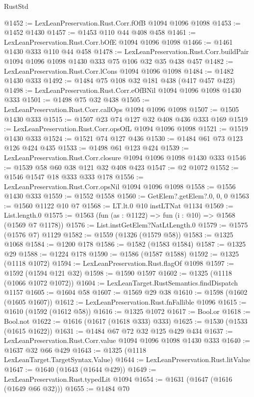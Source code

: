 \begin{lexlean}{RustStd}
\begin{coremodule}
{\begin{coremodule}
{{{{{{{{{{{@1452 := LexLeanPreservation.Rust.Corr.fOfB @1094 @1096 @1098
@1453 := @1452 @1430
@1457 := @1453 @110 @44 @408 @458
@1461 := LexLeanPreservation.Rust.Corr.bOfE @1094 @1096 @1098
@1466 := @1461 @1430 @333 @110 @44 @458
@1478 := LexLeanPreservation.Rust.Corr.buildPair
    @1094
    @1096
    @1098
    @1430
    @333
    @75
    @106
    @32
    @35
    @438
    @457
@1482 := LexLeanPreservation.Rust.Corr.lCons @1094 @1096 @1098
@1484 := @1482 @1430 @333
@1492 := @1484 @75 @108 @32 @181 @438 (@417 @457 @423)
@1498 := LexLeanPreservation.Rust.Corr.eOfBNil @1094 @1096 @1098 @1430 @333
@1501 := @1498 @75 @32 @438
@1505 := LexLeanPreservation.Rust.Corr.callOps @1094 @1096 @1098
@1507 := @1505 @1430 @333
@1515 := @1507 @23 @74 @127 @32 @408 @436 @333 @169
@1519 := LexLeanPreservation.Rust.Corr.opsOfL @1094 @1096 @1098
@1521 := @1519 @1430 @333
@1524 := @1521 @74 @127 @436
@1530 := @1484 @61 @73 @123 @126 @424 @435
@1533 := @1498 @61 @123 @424
@1539 := LexLeanPreservation.Rust.Corr.closure @1094 @1096 @1098 @1430 @333
@1546 := @1539 @58 @60 @38 @121 @32 @408 @423
@1547 := @2 @1072
@1552 := @1546 @1547 @18 @333 @333 @178
@1556 := LexLeanPreservation.Rust.Corr.opsNil @1094 @1096 @1098
@1558 := @1556 @1430 @333
@1559 := @1552 @1558
@1560 := GetElem?.getElem?.{0, 0, 0}
@1563 := @1560 @1122 @10 @7
@1568 := LT.lt.{0} @10 instLTNat @1134
@1569 := List.length.{0}
@1575 := @1563 (fun (as : @1122) => fun (i : @10) => @1568 (@1569 @7 @1178))
@1576 := List.instGetElem?NatLtLength.{0}
@1579 := @1575 (@1576 @7) @1129
@1582 := @1559 (@1326 (@1579 @58))
@1583 := @1325 @1068
@1584 := @1200 @178
@1586 := @1582 (@1583 @1584)
@1587 := @1325 @29
@1588 := @1224 @178
@1590 := @1586 (@1587 @1588)
@1592 := @1325 (@1118 @1072)
@1594 := LexLeanPreservation.Rust.flagOf @1098
@1597 := @1592 (@1594 @121 @32)
@1598 := @1590 @1597
@1602 := @1325 (@1118 (@1066 @1072 @1072))
@1604 := LexLeanTarget.RustSemantics.findDispatch @1157
@1605 := @1604 @58
@1607 := @1569 @29 @38
@1610 := @1598 (@1602 (@1605 @1607))
@1612 := LexLeanPreservation.Rust.fnFallible @1096
@1615 := @1610 (@1592 (@1612 @58))
@1616 := @1325 @1072
@1617 := Bool.or
@1618 := Bool.not
@1622 := @1616 (@1617 (@1618 @333) @333)
@1625 := @1530 (@1533 (@1615 @1622))
@1631 := @1484 @67 @72 @32 @125 @429 @434
@1637 := LexLeanPreservation.Rust.Corr.value @1094 @1096 @1098 @1430 @333
@1640 := @1637 @32 @66 @429
@1643 := @1325 (@1118 LexLeanTarget.TargetSyntax.Value)
@1644 := LexLeanPreservation.Rust.litValue
@1647 := @1640 (@1643 (@1644 @429))
@1649 := LexLeanPreservation.Rust.typedLit @1094
@1654 := @1631 (@1647 (@1616 (@1649 @66 @32)))
@1655 := @1484 @70
}}}}}}}}}}}
\end{coremodule}}
\end{coremodule}
\end{lexlean}
